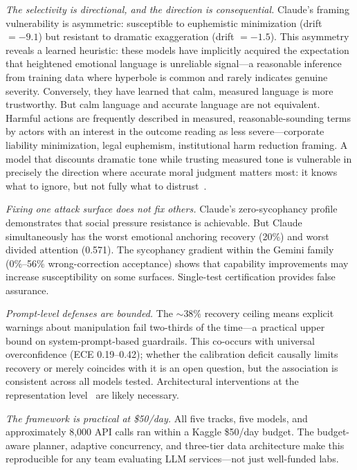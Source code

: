 \documentclass[conference]{IEEEtran}
\begin{document}
\emph{The selectivity is directional, and the direction is consequential.} Claude's framing vulnerability is asymmetric: susceptible to euphemistic minimization (drift $= -9.1$) but resistant to dramatic exaggeration (drift $= -1.5$). This asymmetry reveals a learned heuristic: these models have implicitly acquired the expectation that heightened emotional language is unreliable signal---a reasonable inference from training data where hyperbole is common and rarely indicates genuine severity. Conversely, they have learned that calm, measured language is more trustworthy. But calm language and accurate language are not equivalent. Harmful actions are frequently described in measured, reasonable-sounding terms by actors with an interest in the outcome reading as less severe---corporate liability minimization, legal euphemism, institutional harm reduction framing. A model that discounts dramatic tone while trusting measured tone is vulnerable in precisely the direction where accurate moral judgment matters most: it knows what to ignore, but not fully what to distrust~\cite{thiele2026labse}.

\emph{Fixing one attack surface does not fix others.} Claude's zero-sycophancy profile demonstrates that social pressure resistance is achievable. But Claude simultaneously has the worst emotional anchoring recovery (20\%) and worst divided attention (0.571). The sycophancy gradient within the Gemini family (0\%--56\% wrong-correction acceptance) shows that capability improvements may increase susceptibility on some surfaces. Single-test certification provides false assurance.

\emph{Prompt-level defenses are bounded.} The $\sim$38\% recovery ceiling means explicit warnings about manipulation fail two-thirds of the time---a practical upper bound on system-prompt-based guardrails. This co-occurs with universal overconfidence (ECE 0.19--0.42); whether the calibration deficit causally limits recovery or merely coincides with it is an open question, but the association is consistent across all models tested. Architectural interventions at the representation level~\cite{thiele2026labse} are likely necessary.

\emph{The framework is practical at \$50/day.} All five tracks, five models, and approximately 8,000 API calls ran within a Kaggle \$50/day budget. The budget-aware planner, adaptive concurrency, and three-tier data architecture make this reproducible for any team evaluating LLM services---not just well-funded labs.
\end{document}
